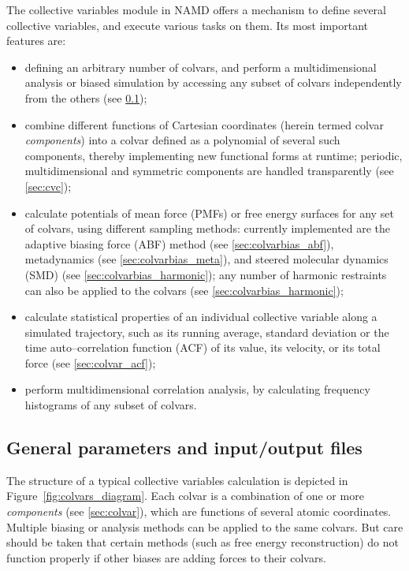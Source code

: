 The collective variables module in NAMD offers a mechanism to define
several collective variables, and execute various tasks on them.
Its most important features are:
\begin{itemize}
\item defining an arbitrary number of colvars, and perform a
  multidimensional analysis or biased simulation by accessing any
  subset of colvars independently from the others (see
  \ref{sec:colvarmodule});
\item combine different functions of Cartesian coordinates
  (herein termed colvar \emph{components}) into a colvar
  defined as a polynomial of several such components, thereby
  implementing new functional forms at runtime; periodic,
  multidimensional and symmetric components are handled transparently
  (see \ref{sec:cvc});
\item calculate potentials of mean force (PMFs) or free energy
  surfaces for any set of colvars, using different sampling methods:
  currently implemented are the adaptive biasing force (ABF)
  method (see \ref{sec:colvarbias_abf}), metadynamics (see
  \ref{sec:colvarbias_meta}), and steered molecular dynamics (SMD)
  (see \ref{sec:colvarbias_harmonic}); any number of harmonic
  restraints can also be applied to the colvars (see
  \ref{sec:colvarbias_harmonic});
\item calculate statistical properties of an individual collective
  variable along a simulated trajectory, such as its running average,
  standard deviation or the time auto--correlation function (ACF)
  of its value, its velocity, or its total force (see
  \ref{sec:colvar_acf});
\item perform multidimensional correlation analysis, by calculating
  frequency histograms of any subset of colvars.
\end{itemize}


\subsection{General parameters and input/output files}
\label{sec:colvarmodule}

The structure of a typical collective variables calculation is
depicted in Figure~\ref{fig:colvars_diagram}.  Each colvar is a
combination of one or more \emph{components} (see \ref{sec:colvar}),
which are functions of several atomic coordinates.  Multiple biasing
or analysis methods can be applied to the same colvars.  But care
should be taken that certain methods (such as free energy
reconstruction) do not function properly if other biases are adding
forces to their colvars.


